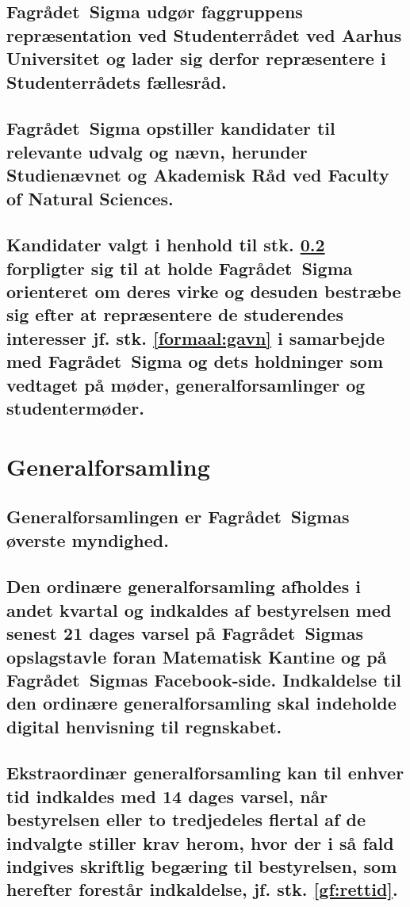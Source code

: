 \documentclass[10pt, danish]{article}
\newcommand{\fagr}{Fagrådet~Sigma}
\begin{document}
	\subsection{\fagr{} udgør faggruppens repræsentation ved Studenterrådet ved Aarhus Universitet og lader sig derfor repræsentere i Studenterrådets fællesråd.}\label{formaal:repr}
	
	\subsection{\fagr{} opstiller kandidater til relevante udvalg og nævn, herunder Studienævnet og Akademisk Råd ved Faculty of Natural Sciences.}\label{formaal:opstilling}
	
        \subsection{Kandidater valgt i henhold til stk. \ref{formaal:opstilling} forpligter sig til at holde \fagr{} orienteret om deres virke og desuden bestræbe sig efter at repræsentere de studerendes interesser jf. stk. \ref{formaal:gavn} i samarbejde med \fagr{} og dets holdninger som vedtaget på møder, generalforsamlinger og studentermøder.}
	
	\section{Generalforsamling}\label{gf}
	
	\subsection{Generalforsamlingen er \fagr{}s øverste myndighed.}
	
	\subsection{Den ordinære generalforsamling afholdes i andet kvartal og indkaldes af bestyrelsen med senest 21 dages varsel på \fagr{}s opslagstavle foran Matematisk Kantine og på \fagr{}s Facebook-side. Indkaldelse til den ordinære generalforsamling skal indeholde digital henvisning til regnskabet.}\label{gf:ordindkaldelse}
	
	\subsection{Ekstraordinær generalforsamling kan til enhver tid indkaldes med 14 dages varsel, når bestyrelsen eller to tredjedeles flertal af de indvalgte stiller krav herom, hvor der i så fald indgives skriftlig begæring til bestyrelsen, som herefter forestår indkaldelse, jf. stk. \ref{gf:rettid}.}\label{gf:ekstraindkaldelse}
	
\end{document}
